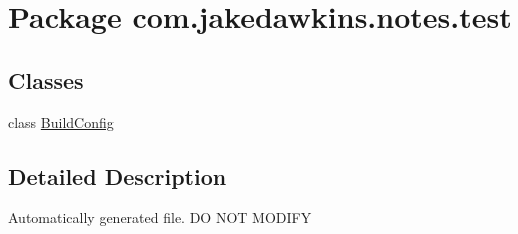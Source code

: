 \hypertarget{namespacecom_1_1jakedawkins_1_1notes_1_1test}{}\section{Package com.\+jakedawkins.\+notes.\+test}
\label{namespacecom_1_1jakedawkins_1_1notes_1_1test}
\subsection*{Classes}
\begin{DoxyCompactItemize}
\item 
class \hyperlink{classcom_1_1jakedawkins_1_1notes_1_1test_1_1_build_config}{Build\+Config}
\end{DoxyCompactItemize}


\subsection{Detailed Description}
Automatically generated file. DO N\+OT M\+O\+D\+I\+FY 